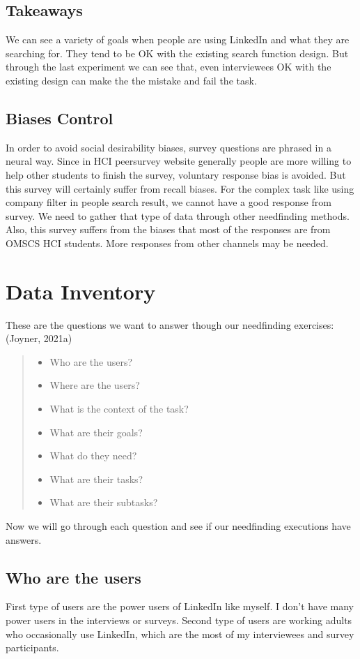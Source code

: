 \documentclass[
	letterpaper, %
]{jdf}
\begin{document}
\subsection{Takeaways}
We can see a variety of goals when people are using LinkedIn and what they are searching for. They tend to be OK with the existing search function design. But through the last experiment we can see that, even interviewees OK with the existing design can make the the mistake and fail the task. 

\subsection{Biases Control}
In order to avoid social desirability biases, survey questions are phrased in a neural way. Since in HCI peersurvey website generally people are more willing to help other students to finish the survey, voluntary response bias is avoided. But this survey will certainly suffer from recall biases. For the complex task like using company filter in people search result, we cannot have a good response from survey. We need to gather that type of data through other needfinding methods. Also, this survey suffers from the biases that most of the responses are from OMSCS HCI students. More responses from other channels may be needed.


\section{Data Inventory}
These are the questions we want to answer though our needfinding exercises: (Joyner, 2021a)
\begin{quotation}
	\noindent
	\begin{itemize}
	    \item Who are the users?
	    \item Where are the users?
	    \item What is the context of the task?
	    \item What are their goals?
	    \item What do they need?
	    \item What are their tasks?
	    \item What are their subtasks?
    \end{itemize}
\end{quotation}

Now we will go through each question and see if our needfinding executions have answers.

\subsection{Who are the users}
First type of users are the power users of LinkedIn like myself. I don't have many power users in the interviews or surveys. Second type of users are working adults who occasionally use LinkedIn, which are the most of my interviewees and survey participants.
\end{document}
